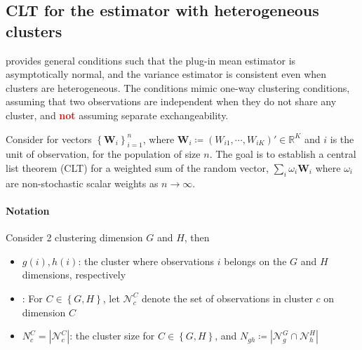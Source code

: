 \documentclass[twoside]{article}
\begin{document}
\subsection{CLT for the estimator with heterogeneous clusters}
\citet{yap2023general} provides general conditions such that the plug-in mean estimator is asymptotically normal, and the \citet{cameron2011robust} variance estimator is consistent even when clusters are heterogeneous. The conditions mimic one-way clustering conditions, assuming that two observations are independent when they do not share any cluster, and \textbf{\textcolor{red}{not}} assuming separate exchangeability.

Consider for vectors $\left\{\mathbf{W}_i\right\}^n_{i=1}$, where $\mathbf{W}_i \coloneq  ( W_{i1},\cdots, W_{iK} )'\in \mathbb{R}^K $ and $i$ is the unit of observation, for the population of size $n$. The goal is to establish a central list theorem (CLT) for a 
weighted sum of the random vector, $\sum_i \omega_i \mathbf{W}_i$ where $\omega_i$ are non-stochastic scalar weights as $n\rightarrow \infty$.

\paragraph*{Notation}
Consider 2 clustering dimension $G$ and $H$, then 
\begin{itemize}
    \item $g(i),h(i)$: the cluster where observations $i$ belongs on the $G$ and $H$ dimensions, respectively
    \item {}: For $C\in \left\{G,H\right\}$, let $\mathcal{N}^C_c$ denote the set of observations in cluster $c$ on dimension $C$
    \item $N^C_c = \left\vert \mathcal{N}^C_c \right\vert$: the cluster size for $C\in \left\{G,H\right\}$, and $N_{gh}\coloneq \left\vert \mathcal{N}^G_g \cap \mathcal{N}^H_h \right\vert$
\end{itemize}
\end{document}
